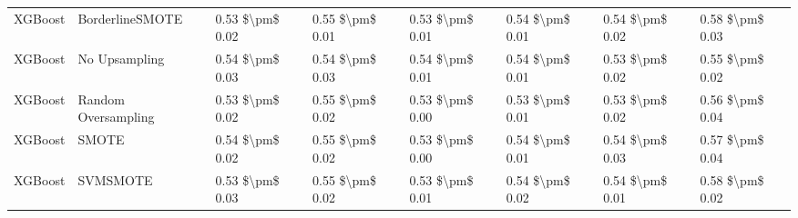 \begin{tabular}{llllllll}
                        XGBoost &               BorderlineSMOTE & 0.53 \$\textbackslash pm\$ 0.02 &           0.55 \$\textbackslash pm\$ 0.01 &       0.53 \$\textbackslash pm\$ 0.01 &        0.54 \$\textbackslash pm\$ 0.01 &                         0.54 \$\textbackslash pm\$ 0.02 &     0.58 \$\textbackslash pm\$ 0.03 \\
                        XGBoost &                 No Upsampling & 0.54 \$\textbackslash pm\$ 0.03 &           0.54 \$\textbackslash pm\$ 0.03 &       0.54 \$\textbackslash pm\$ 0.01 &        0.54 \$\textbackslash pm\$ 0.01 &                         0.53 \$\textbackslash pm\$ 0.02 &     0.55 \$\textbackslash pm\$ 0.02 \\
                        XGBoost &           Random Oversampling & 0.53 \$\textbackslash pm\$ 0.02 &           0.55 \$\textbackslash pm\$ 0.02 &       0.53 \$\textbackslash pm\$ 0.00 &        0.53 \$\textbackslash pm\$ 0.01 &                         0.53 \$\textbackslash pm\$ 0.02 &     0.56 \$\textbackslash pm\$ 0.04 \\
                        XGBoost &                         SMOTE & 0.54 \$\textbackslash pm\$ 0.02 &           0.55 \$\textbackslash pm\$ 0.02 &       0.53 \$\textbackslash pm\$ 0.00 &        0.54 \$\textbackslash pm\$ 0.01 &                         0.54 \$\textbackslash pm\$ 0.03 &     0.57 \$\textbackslash pm\$ 0.04 \\
                        XGBoost &                      SVMSMOTE & 0.53 \$\textbackslash pm\$ 0.03 &           0.55 \$\textbackslash pm\$ 0.02 &       0.53 \$\textbackslash pm\$ 0.01 &        0.54 \$\textbackslash pm\$ 0.02 &                         0.54 \$\textbackslash pm\$ 0.01 &     0.58 \$\textbackslash pm\$ 0.02 \\
\bottomrule
\end{tabular}
